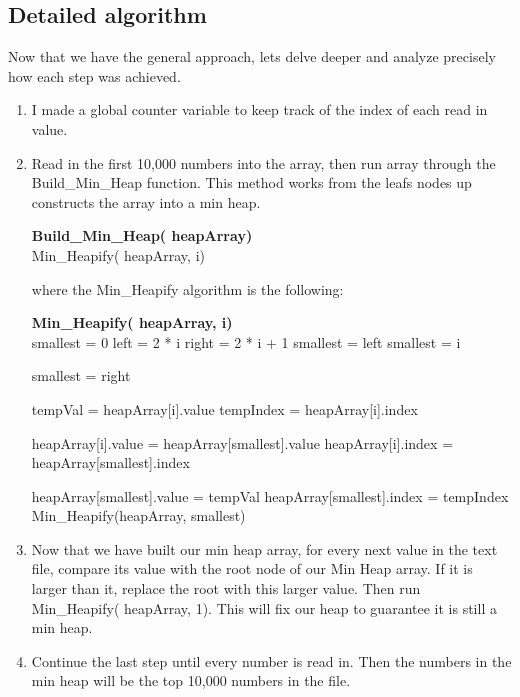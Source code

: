 \documentclass[12pt,letterpaper]{article}
\begin{document}
\subsection{ Detailed algorithm}
Now that we have the general approach, lets delve deeper and analyze precisely how each step was achieved.
\begin{enumerate}
\item I made a global counter variable to keep track of the index of each read in value. 
\item Read in the first 10,000 numbers into the array, then run array through the Build\_Min\_Heap function. This method works from the leafs nodes up constructs the array into a min heap.


\begin{algorithm}[H]
	\NoCaptionOfAlgo
	{\bf Build\_Min\_Heap( heapArray)} \\
	{
		Min\_Heapify( heapArray, i) \;
	}
\end{algorithm}

where the Min\_Heapify algorithm is the following:

\begin{algorithm}[H]
	\NoCaptionOfAlgo
	{\bf Min\_Heapify( heapArray, i) }\\
	smallest = 0 \;
	left = 2 * i \;
	right = 2 * i + 1 \;
	{
		smallest = left\;
	}{
		smallest = i \;
	}
	
	{
		smallest = right\;
	}
	
	{
		tempVal = heapArray[i].value \;
		tempIndex = heapArray[i].index \;
		
		heapArray[i].value = heapArray[smallest].value \;
		heapArray[i].index = heapArray[smallest].index \;
		
		heapArray[smallest].value = tempVal \;
		heapArray[smallest].index = tempIndex \;
		Min\_Heapify(heapArray, smallest)\;
	}
\end{algorithm}

	\item Now that we have built our min heap array, for every next value in the text file, compare its value with the root node of our Min Heap array. If it is larger than it, replace the root with this larger value. Then run Min\_Heapify( heapArray, 1). This will fix our heap to guarantee it is still a min heap.
	\item Continue the last step until every number is read in. Then the numbers in the min heap will be the top 10,000 numbers in the file.


\end{enumerate}
\end{document}
